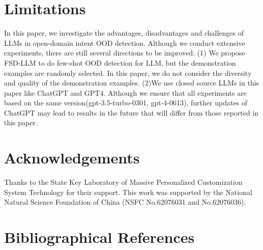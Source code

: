 \documentclass[10pt, a4paper]{article}
\begin{document}
\section{Limitations}
In this paper, we investigate the advantages, disadvantages and challenges of LLMs in open-domain intent OOD detection. Although we conduct extensive experiments, there are still several directions to be improved: (1) We propose FSD-LLM to do few-shot OOD detection for LLM, but the demonstration examples are randomly selected. In this paper, we do not consider the diversity and quality of the demonstration examples. (2)We use closed source LLMs in this paper like ChatGPT and GPT4. Although we ensure that all experiments are based on the same version(gpt-3.5-turbo-0301, gpt-4-0613), further updates of ChatGPT may lead to results in the future that will differ from those reported in this paper. 

\section{Acknowledgements}
Thanks to the State Key Laboratory of Massive Personalized Customization System Technology for their support. This work was supported by the National Natural Science Foundation of China (NSFC No.62076031 and No.62076036).




\nocite{*}
\section{Bibliographical References}\label{sec:reference}




\end{document}
